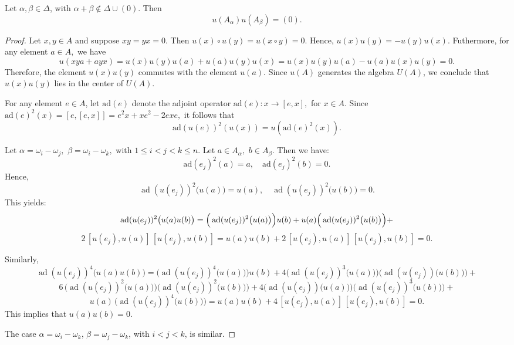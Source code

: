 \documentclass[10pt,a4paper]{amsart}
\begin{document}
\begin{lem}\label{L1} Let \( \alpha, \beta \in \Delta \), with \( \alpha + \beta \not\in \Delta \cup (0)\). Then  
\[
u(A_\alpha) u(A_\beta) = (0).
\] \end{lem}

\begin{proof} Let $ x, y \in A $ and suppose $  x y = y x =0. $  
Then   $
u(x)\circ u(y) = u(x \circ y) =0 .$  Hence, $u(x) u(y)=-u(y) u(x).$
Futhermore, for any element $a\in A,$ we have $$ u(xya +ayx)=u(x) u(y) u(a) + u(a) u(y) u(x) = u(x) u(y) u(a) - u(a) u(x) u(y) =0. $$ Therefore, the element $u(x) u(y)$ commutes with the element $u(a).$ Since $u(A)$ generates the algebra $U(A)$, we conclude that $u(x) u(y)$ lies in the center of $U(A).$

For any element $e\in A$, let $\text{ad}(e)$ denote the adjoint operator $\text{ad}(e):x \to [e,x],$ for $x\in A.$  Since $\text{ad}(e)^2 (x)= [e,[e,x]]=e^2 x + x e^2 - 2 exe,$ it follows that  $$ \text{ad}(u(e))^2 (u(x)) =u(\text{ad}(e)^2(x)) .$$ 

Let $\alpha = \omega_i - \omega_j,$ $\beta =\omega_i - \omega_k,$ with $1 \leq i < j< k \leq n.$ Let $a\in A_{\alpha},$ $b\in A_{\beta}.$ Then we have: $$\text{ad}(e_j)^2 (a)= a, \quad \text{ad}(e_j)^2 (b)= 0.$$
Hence,
\[
\operatorname{ad}(u(e_j))^2\big(u(a)\big) = u(a), \quad \operatorname{ad}(u(e_j))^2\big(u(b)\big) = 0.
\]
This yields:
\[
	\operatorname{ad}(u(e_j))^2\big(u(a)u(b)\big) = \Big(\operatorname{ad}(u(e_j))^2\big(u(a)\big)\Big) u(b)+ \\
	 u(a)\Big(\operatorname{ad}(u(e_j))^2\big(u(b)\big)\Big) + \]
\[	  2\, [u(e_j), u(a)] \, [ u(e_j) , u(b) ]= u(a) u(b)+ 2\, [u(e_j), u(a)] \, [ u(e_j) , u(b) ] = 0.
\]


Similarly,
\[
	\operatorname{ad}(u(e_j))^4\big(u(a)u(b)\big)  = \Big(\operatorname{ad}(u(e_j))^4\big(u(a)\big)\Big) u(b)+4  
	\Big(\operatorname{ad}(u(e_j))^3\big(u(a)\big)\Big) \Big(\operatorname{ad}(u(e_j))\big(u(b)\big)\Big) + \]
	\[	  6\, 	\Big(\operatorname{ad}(u(e_j))^2\big(u(a)\big)\Big) \Big(\operatorname{ad}(u(e_j))^2\big(u(b)\big)\Big) + 4  \Big(\operatorname{ad}(u(e_j))\big(u(a)\big)\Big) \Big(\operatorname{ad}(u(e_j))^3\big(u(b)\big)\Big)+ \]
	\[	u(a) \, \Big(\operatorname{ad}(u(e_j))^4\big(u(b)\big)\Big) =
	u(a) u(b)+ 4\, [u(e_j), u(a)] \, [ u(e_j) , u(b) ] =0.
\] This implies that $u(a) u(b) = 0$.

The case $\alpha = \omega_i - \omega_k$, $\beta = \omega_j - \omega_k$, with $i < j < k$, is similar.


\end{proof}
\end{document}
